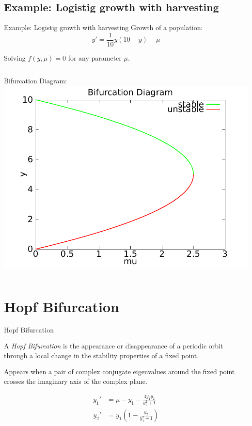 \documentclass{beamer}
\begin{document}
\subsection{Example: Logistig growth with harvesting}
\begin{frame}{Example: Logistig growth with harvesting}
    Growth of a population:
    $$y' = \frac{1}{10}y(10 - y) - \mu $$

    Solving $f(y,\mu) = 0$ for any parameter $\mu$. 
     \pause
     \begin{columns}
            Bifurcation Diagram:
            \includegraphics[width=.8\textwidth]{grafik/harvesting}
    \end{columns}
\end{frame}

\section{Hopf Bifurcation}
\begin{frame}{Hopf Bifurcation}
    \begin{definition}
        A \emph{Hopf Bifurcation} is the appearance or disappearance of a periodic orbit 
        through a local change in the stability properties of a fixed point.
    \end{definition}
    Appears when a pair of complex conjugate eigenvalues around the fixed point 
    crosses the imaginary axis of the complex plane.

        \begin{align}
        y_{1}' &= \mu - y_{1} - \frac{4 y_{1} y_{2} }{ y_{1}^{2} + 1} \\
        y_{2}' &= y_{1} (1 - \frac{y_{2}}{y_{1}^{2} + 1})
        \end{align}
\end{frame} 
\end{document}
